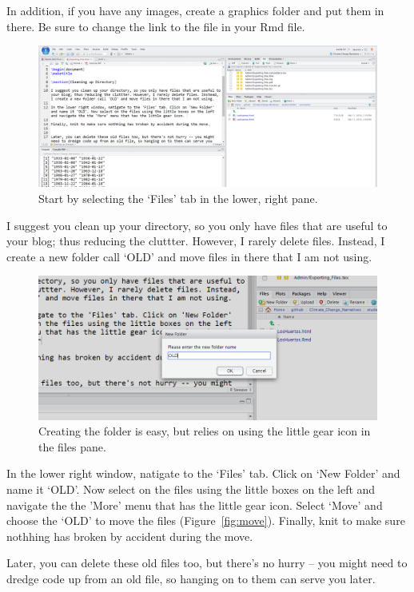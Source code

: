 \documentclass{article}\usepackage[]{graphicx}\usepackage[]{color}
\begin{document}
In addition, if you have any images, create a graphics folder and put them in there. Be sure to change the link to the file in your Rmd file.

\begin{figure}
\includegraphics[width=\textwidth]{FourWindows}
\caption{Start by selecting the `Files' tab in the lower, right pane.}
\end{figure}

I suggest you clean up your directory, so you only have files that are useful to your blog; thus reducing the cluttter. However, I rarely delete files. Instead, I create a new folder call `OLD' and move files in there that I am not using.

\begin{figure}
\includegraphics[width=\textwidth]{CreateFolder}
\caption{Creating the folder is easy, but relies on using the little gear icon in the files pane.}
\end{figure}

In the lower right window, natigate to the `Files' tab. Click on `New Folder' and name it `OLD'. Now select on the files using the little boxes on the left and navigate the the 'More' menu that has the little gear icon. Select `Move' and choose the `OLD' to move the files (Figure~\ref{fig:move}). Finally, knit to make sure nothhing has broken by accident during the move. 

Later, you can delete these old files too, but there's no hurry -- you might need to dredge code up from an old file, so hanging on to them can serve you later. 
\end{document}
